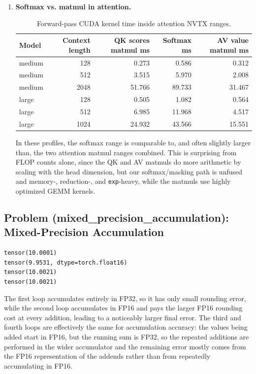 \documentclass[11pt]{article}
\begin{document}
\begin{enumerate}
  \item \textbf{Softmax vs. matmul in attention.}
  \begin{table}[H]
    \centering
    \caption{Forward-pass CUDA kernel time inside attention NVTX ranges.}
    \begin{tabular}{lrrrr}
      \toprule
      Model & Context length & QK scores matmul ms & Softmax ms & AV value matmul ms \\
      \midrule
      medium & 128 & 0.273 & 0.586 & 0.312 \\
      medium & 512 & 3.515 & 5.970 & 2.008 \\
      medium & 2048 & 51.766 & 89.733 & 31.467 \\
      large & 128 & 0.505 & 1.082 & 0.564 \\
      large & 512 & 6.985 & 11.968 & 4.517 \\
      large & 1024 & 24.932 & 43.566 & 15.551 \\
      \bottomrule
    \end{tabular}
  \end{table}
  In these profiles, the softmax range is comparable to, and often slightly larger than, the two attention matmul ranges combined. This is surprising from FLOP counts alone, since the QK and AV matmuls do more arithmetic by scaling with the head dimension, but our softmax/masking path is unfused and memory-, reduction-, and \texttt{exp}-heavy, while the matmuls use highly optimized GEMM kernels.
\end{enumerate}

\subsection{Problem (mixed\_precision\_accumulation): Mixed-Precision Accumulation}

\begin{verbatim}
tensor(10.0001)
tensor(9.9531, dtype=torch.float16)
tensor(10.0021)
tensor(10.0021)
\end{verbatim}

The first loop accumulates entirely in FP32, so it has only small rounding error, while the second loop accumulates in FP16 and pays the larger FP16 rounding cost at every addition, leading to a noticeably larger final error. The third and fourth loops are effectively the same for accumulation accuracy: the values being added start in FP16, but the running sum is FP32, so the repeated additions are performed in the wider accumulator and the remaining error mostly comes from the FP16 representation of the addends rather than from repeatedly accumulating in FP16.
\end{document}
